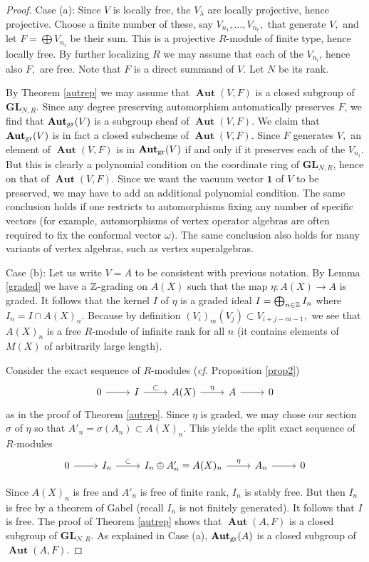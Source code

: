 \documentclass{article}
\theoremstyle{definition}
\def\BAut{\ensuremath{\operatorname{\mathbf{Aut}}}}
\def\BGL{\ensuremath{\mathbf{G}\mathbf{L}}}
\begin{document}
\begin{proof} Case (a): Since $V$ is locally free, the $V_\lambda$ are locally projective, hence projective. Choose a finite number of these, say $V_{n_1}, \dots , V_{n_\ell},$ that generate $V,$ and let $F = \bigoplus V_{n_i}$ be their sum. This is a projective $R$-module of finite type, hence locally free. By further localizing $R$ we may assume that each of the $V_{n_i}$, hence also $F,$ are free. Note that $F$ is a direct summand of $V$. Let $N$ be its rank. 
 
By Theorem \ref{autrep} we may assume that  $\BAut(V,F)$ is  a closed subgroup of $\BGL_{N,R}$. 
Since any degree preserving automorphism automatically preserves $F$, we find that $\BAut_{\rm gr}(V)$ is a subgroup sheaf of $\BAut(V,F)$. We claim that $\BAut_{\rm gr}(V)$ is in fact a closed subscheme of  $\BAut(V,F).$
Since $F$ generates $V,$ an element of $\BAut(V,F)$ is in $\BAut_{\rm gr}(V)$ if and only if it preserves each of the $V_{n_i}.$ But this is clearly a polynomial condition on the coordinate ring of $\BGL_{N,R}$, hence on that of $\BAut(V,F).$ 
 Since we want the vacuum vector $\mathbf 1$ of $V$ to be preserved, we may have to add an additional polynomial condition.  The same conclusion holds if one restricts to automorphisms fixing any number of specific vectors (for example, automorphisms of vertex operator algebras are often required to fix the conformal vector $\omega$). The same conclusion also holds for  many variants of vertex algebras, such as vertex superalgebras.

	Case (b): Let us write $V = A$ to be consistent with previous notation. By Lemma \ref{graded} we have a $\Bbb{Z}$-grading on $A(X)$ such that the map $\eta \colon A(X) \to A$ is graded. It follows that the kernel $I$ of $\eta$ is a graded ideal $I = \bigoplus_{n \in \Bbb{Z}}I_n$ where $I_n = I \cap A(X)_n.$ Because by definition $(V_i) _{m} (V_j) \subset V_{i + j -m - 1},$ we see that $A(X)_n$ is a free $R$-module of infinite rank for all $n$ (it contains elements of $M(X)$ of arbitrarily large length).  

Consider the  exact sequence of $R$-modules ({\it cf.} Proposition \ref{prop2})
\[ \begin{tikzcd} 0 \ar[r] & I \ar[r, "\subset"] & A(X) \ar[r, "\eta"] & A \ar[r] & 0 \end{tikzcd} \]
as in the proof of Theorem \ref{autrep}. Since $\eta$ is graded, we may chose our section $\sigma$ of $\eta$ so that $A'_n = \sigma(A_n) \subset A(X)_n.$ This yields the split exact sequence of $R$-modules 
\[ \begin{tikzcd} 0 \ar[r] & I_n \ar[r, "\subset"] & I_n \oplus A'_n = A(X)_n \ar[r, "\eta"] & A_n \ar[r] & 0 \end{tikzcd} \]

Since $A(X)_n$ is free and $A'_n$ is free of finite rank, $I_n$ is stably free. But then $I_n$ is free by a theorem of Gabel \cite[Ch. I Prop. 4.2]{Lam} (recall $I_n$ is not finitely generated). It follows that $I$ is free. The proof of Theorem \ref{autrep} shows that $\BAut(A,F)$ is a closed subgroup of $\BGL_{N,R}.$  As explained in Case (a), $\BAut_{\rm gr}(A)$ is a closed subgroup of $\BAut(A,F).$  \end{proof}
\end{document}
